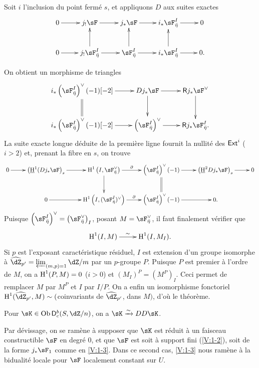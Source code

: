 Soit $i$ l'inclusion du point fermé $s$, et appliquons $D$ aux suites 
exactes 
\[\xymatrix{
  0 \ar[r] 
    & j_! \sF \ar[r] 
    & j_\ast \sF \ar[r] 
    & i_\ast \sF_{\bar\eta}^I \ar[r] 
    & 0 \\
  0 \ar[r] 
    & j_! \sF_{\bar\eta}^I \ar[r] \ar[u] 
    & \sF_{\bar\eta}^I \ar[r] \ar[u] 
    & i_\ast \sF_{\bar\eta}^I \ar[r] \ar[u]
    & 0 \text{.}
}\]

On obtient un morphisme de triangles 
\[\xymatrix{
  i_\ast\left(\sF_{\bar\eta}^I\right)^\vee (-1)[-2] \ar[r] \ar@{=}[d] 
    & D j_\ast\sF \ar[r] \ar[d] 
    & \R j_\ast \sF^\vee \ar[d] \\
  i_\ast\left(\sF_{\bar\eta}^I\right)^\vee(-1)[-2] \ar[r] 
    & \left(\sF_{\bar\eta}^I\right)^\vee \ar[r] 
    & \R j_\ast \sF_{\bar\eta}^I \text{.}
}\]
La suite exacte longue déduite de la première ligne fournit la nullité des 
$\operatorname{\mathsf{Ext}}^i$ ($i>2$) et, prenant la fibre en $s$, on trouve 
\[\xymatrix{
  0 \ar[r] 
    & \left(\underline\h^1(D j_\ast\sF\right)_s \ar[r] 
    & \h^1\left(I,\sF_{\bar\eta}^\vee\right) \ar[r]^-\partial \ar[d] 
    & \left(\sF_{\bar\eta}^I\right)^\vee(-1) \ar[r] \ar@{=}[d] 
    & \left(\underline\h^2 D j_\ast\sF\right)_s \ar[r] 
    & 0 \\
  & 0 \ar[r] 
    & \h^1\left(I,(\sF_{\bar\eta}^I)^\vee\right) \ar[r]^-\partial 
    & \left(\sF_{\bar\eta}^I\right)^\vee(-1) \ar[r] 
    & 0 \text{.}
}\]
Puisque 
$\left(\sF_{\bar\eta}^I\right)^\vee = \left(\sF_{\bar\eta}^\vee\right)_I$, 
posant $M=\sF_{\bar\eta}^\vee$, il faut finalement vérifier que 
\[\xymatrix{
  \h^1(I,M) \ar[r]^-\sim 
    & \h^1(I,M_I) \text{.}
}\]
Si $p$ est l'exposant caractéristique résiduel, $I$ est extension d'un 
groupe isomorphe à $\widehat\dZ_{p'} = \varprojlim_{(m,p)=1} \dZ/m$ par un 
$p$-groupe $P$. Puisque $P$ est premier à l'ordre de $M$, on a 
$\operatorname{H}^1(P,M)=0$ ($i>0$) et $(M_I)^P=(M^P)_I$. Ceci permet de remplacer $M$ par 
$M^P$ et $I$ par $I/P$. On a enfin un isomorphisme fonctoriel 
$\h^1(\widehat\dZ_{p'},M)\sim ($coinvariants de $\widehat\dZ_{p'}$, dans $M)$, 
d'où le théorème. 





\begin{theorem_}\label{V:1-4}
Pour $\sK\in \ob\D_c^b(S,\dZ/n)$, on a $\sK\iso D D \sK$.
\end{theorem_}

Par dévissage, on se ramène à supposer que $\sK$ est réduit à un 
faisceau constructible $\sF$ en degré $0$, et que $\sF$ est soit à support 
fini (\ref{V:1-2}), soit de la forme $j_\ast\sF_1$ comme en \ref{V:1-3}. Dans 
ce second cas, \ref{V:1-3} nous ramène à la bidualité locale pour $\sF$ 
localement constant sur $U$. 










